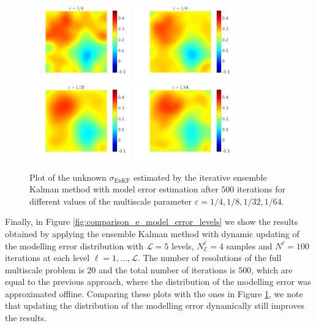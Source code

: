 \documentclass[10pt]{article}
\begin{document}
\begin{figure}[t]
\centering
\includegraphics[width = 0.39\textwidth]{figures/ensemble_500_e4_model_error}
\includegraphics[width = 0.39\textwidth]{figures/ensemble_500_e8_model_error}
\\
\includegraphics[width = 0.39\textwidth]{figures/ensemble_500_e32_model_error}
\includegraphics[width = 0.39\textwidth]{figures/ensemble_500_e64_model_error}
\caption{Plot of the unknown $\sigma_{\mathrm{EnKF}}$ estimated by the iterative ensemble Kalman method with model error estimation after $500$ iterations for different values of the multiscale parameter $\varepsilon = 1/4, 1/8, 1/32, 1/64$.}
\label{fig:comparison_e_model_error}
\end{figure}

Finally, in Figure \ref{fig:comparison_e_model_error_levels} we show the results obtained by applying the ensemble Kalman method with dynamic updating of the modelling error distribution with $\mathcal{L} = 5$ levels, $N_{\mathcal{E}}^{\ell} = 4$ samples and $N^{\ell} = 100$ iterations at each level $\ell = 1, \dots, \mathcal{L}$. The number of resolutions of the full multiscale problem is $20$ and the total number of iterations is $500$, which are equal to the previous approach, where the distribution of the modelling error was approximated offline. Comparing these plots with the ones in Figure \ref{fig:comparison_e_model_error}, we note that updating the distribution of the modelling error dynamically still improves the results.
\end{document}
